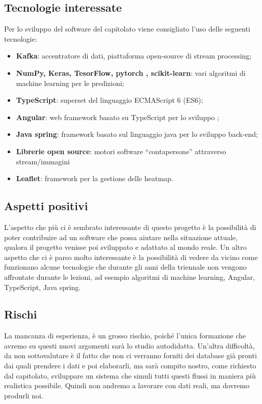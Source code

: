 \documentclass[../studio-di-fattibilita.tex]{subfiles}
\begin{document}
\subsection{Tecnologie interessate}%
\label{sub:c3_tecnologie_interessate}
Per lo sviluppo del software del capitolato viene consigliato l’uso delle seguenti tecnologie:
\begin{itemize}
  \item \textbf{Kafka}: accentratore di dati, piattaforma open-source di stream processing;
  \item \textbf{NumPy, Keras, TesorFlow, pytorch , scikit-learn}: vari algoritmi di machine learning per le predizioni;
  \item \textbf{TypeScript}: superset del linguaggio ECMAScript 6 (ES6);
  \item \textbf{Angular}: web framework basato su TypeScript per lo sviluppo ;
  \item \textbf{Java spring}: framework basato sul linguaggio java per lo sviluppo back-end;
  \item \textbf{Librerie open source}: motori software “contapersone” attraverso stream/immagini
  \item \textbf{Leaflet}: framework per la gestione delle heatmap.
\end{itemize}

\subsection{Aspetti positivi}%
\label{sub:c3_aspetti_positivi}
L’aspetto che più ci è sembrato interessante di questo progetto è la possibilità di poter contribuire ad un software che possa aiutare nella situazione attuale, qualora il progetto venisse poi sviluppato e adattato al mondo reale. Un altro aspetto che ci è parso molto interessante è la possibilità di vedere da vicino come funzionano alcune tecnologie che durante gli anni della triennale non vengono affrontate durante le lezioni, ad esempio algoritmi di machine learning, Angular, TypeScript, Java spring.

\subsection{Rischi}%
\label{sub:c3_rischi}
La mancanza di esperienza, è un grosso rischio, poiché l’unica formazione che avremo su questi nuovi argomenti sarà lo studio autodidatta. Un’altra difficoltà, da non sottovalutare è il fatto che non ci verranno forniti dei database già pronti dai quali prendere i dati e poi elaborarli, ma sarà compito nostro, come richiesto dal capitolato, sviluppare un sistema che simuli tutti questi flussi in maniera più realistica possibile. Quindi non andremo a lavorare con dati reali, ma dovremo produrli noi.
\end{document}
